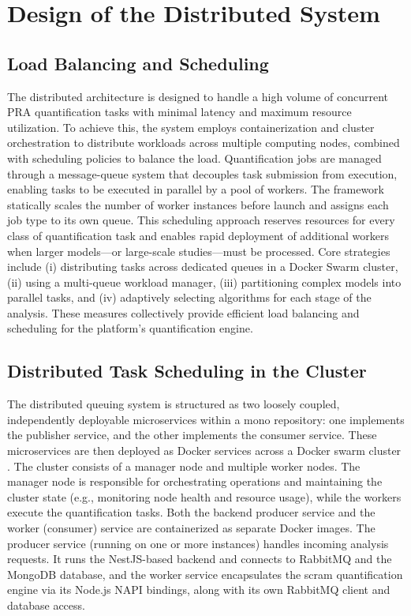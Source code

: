 {

\section{Design of the Distributed System}

\subsection{Load Balancing and Scheduling}

The distributed architecture is designed to handle a high volume of concurrent PRA quantification tasks with minimal latency and maximum resource utilization. To achieve this, the system employs containerization and cluster orchestration to distribute workloads across multiple computing nodes, combined with scheduling policies to balance the load. Quantification jobs are managed through a message-queue system that decouples task submission from execution, enabling tasks to be executed in parallel by a pool of workers. The framework statically scales the number of worker instances before launch and assigns each job type to its own queue. This scheduling approach reserves resources for every class of quantification task and enables rapid deployment of additional workers when larger models—or large-scale studies—must be processed. Core strategies include (i) distributing tasks across dedicated queues in a Docker Swarm cluster, (ii) using a multi-queue workload manager, (iii) partitioning complex models into parallel tasks, and (iv) adaptively selecting algorithms for each stage of the analysis. These measures collectively provide efficient load balancing and scheduling for the platform's quantification engine.

\subsection{Distributed Task Scheduling in the Cluster}

The distributed queuing system is structured as two loosely coupled, independently deployable microservices within a mono repository: one implements the publisher service, and the other implements the consumer service. These microservices are then deployed as Docker services across a Docker swarm cluster \cite{Swarm}. The cluster consists of a manager node and multiple worker nodes. The manager node is responsible for orchestrating operations and maintaining the cluster state (e.g., monitoring node health and resource usage), while the workers execute the quantification tasks. Both the backend producer service and the worker (consumer) service are containerized as separate Docker  images. The producer service (running on one or more instances) handles incoming analysis requests. It runs the NestJS-based backend \cite{Documentation} and connects to RabbitMQ \cite{RabbitMQ} and the MongoDB \cite{MongoDB} database, and the worker service encapsulates the scram \cite{scram} quantification engine via its Node.js NAPI \cite{Node} bindings, along with its own RabbitMQ client and database access.

}
